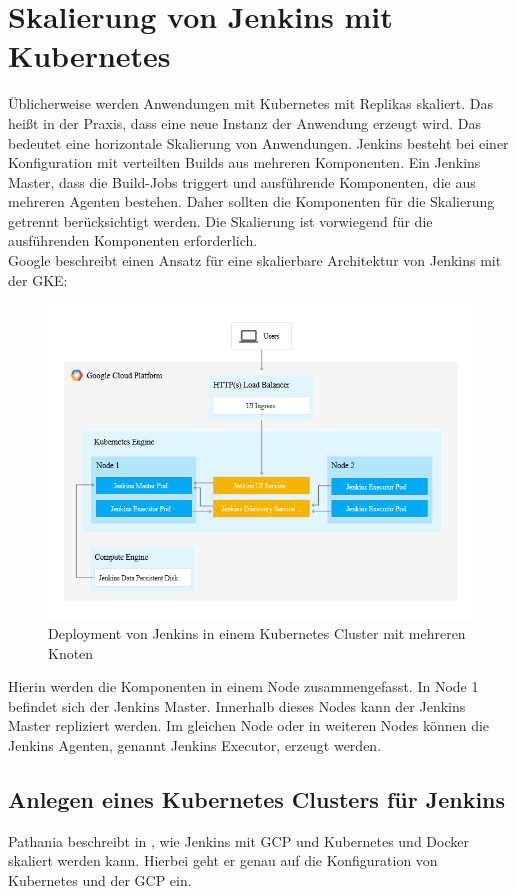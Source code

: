 \section{Skalierung von Jenkins mit Kubernetes}
Üblicherweise werden Anwendungen mit Kubernetes mit Replikas skaliert. Das heißt in der Praxis, dass eine neue Instanz der Anwendung erzeugt wird. Das bedeutet eine horizontale Skalierung von Anwendungen. Jenkins besteht bei einer Konfiguration mit verteilten Builds aus mehreren Komponenten. Ein Jenkins Master, dass die Build-Jobs triggert und ausführende Komponenten, die aus mehreren Agenten bestehen. Daher sollten die Komponenten für die Skalierung getrennt berücksichtigt werden. Die Skalierung ist vorwiegend für die ausführenden Komponenten erforderlich. 
\medskip
\\
Google beschreibt einen Ansatz für eine skalierbare Architektur von Jenkins mit der \ac{GKE}:

\begin{figure}[htbp]
 \centering
 \includegraphics[width=1.0\textwidth]{gfx/jenkins-kubernetes-architecture.png}
 \caption{Deployment von Jenkins in einem Kubernetes Cluster mit mehreren Knoten \cite{Google:GKEJenkins}}
\end{figure}
Hierin werden die Komponenten in einem Node zusammengefasst. In Node 1 befindet sich der Jenkins Master. Innerhalb dieses Nodes kann der Jenkins Master repliziert werden. Im gleichen Node oder in weiteren Nodes können die Jenkins Agenten, genannt Jenkins Executor, erzeugt werden.


\subsection{Anlegen eines Kubernetes Clusters für Jenkins}
Pathania beschreibt in \cite{Pathania2017}, wie Jenkins mit \ac{GCP} und Kubernetes und Docker skaliert werden kann. Hierbei geht er genau auf die Konfiguration von Kubernetes und der \ac{GCP} ein.


